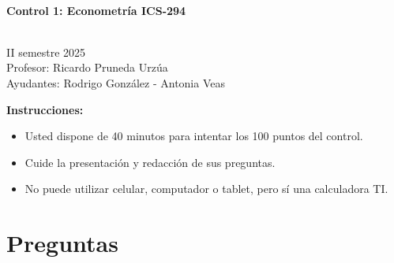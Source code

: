 \documentclass[10pt,a4paper]{article}
\begin{document}
\vspace{5cm}



\begin{center}
\begin{large}
\textbf{\\Control 1: Econometría ICS-294}
\end{large}\\
\vspace{0.2cm}
II semestre 2025\\
Profesor: Ricardo Pruneda Urzúa\\
Ayudantes: Rodrigo González - Antonia Veas\\
\end{center}

\textbf{Instrucciones:} 

\begin{itemize}

    \item Usted dispone de 40 minutos  para intentar los 100 puntos del control.
    \item Cuide la presentación y redacción de sus preguntas.
    \item No puede utilizar celular, computador o tablet, pero sí una calculadora TI.
     
\end{itemize}

\section{Preguntas}
\end{document}
